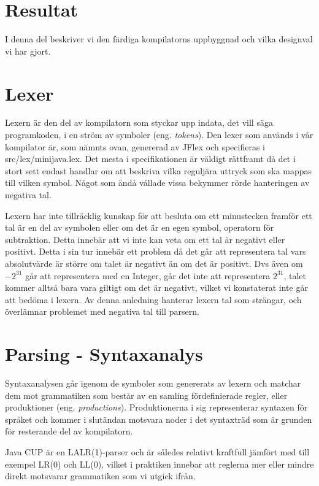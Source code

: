 \documentclass[a4paper,11pt]{article}
\newcommand{\trans}[2][eng.]{(#1 \emph{#2})}
\renewcommand{\*}[0]{\cdot}
\begin{document}
\section*{Resultat}

I denna del beskriver vi den färdiga kompilatorns uppbyggnad och vilka designval vi har gjort.

\section*{Lexer}

Lexern är den del av kompilatorn som styckar upp indata, det vill säga
programkoden, i en ström av symboler \trans{tokens}. Den lexer som används i
vår kompilator är, som nämnts ovan, genererad av JFlex och specifieras i
src/lex/minijava.lex. Det mesta i specifikationen är väldigt rättframt då det i
stort sett endast handlar om att beskriva vilka reguljära uttryck som ska
mappas till vilken symbol. Något som ändå vållade vissa bekymmer rörde
hanteringen av negativa tal.

Lexern har inte tillräcklig kunskap för att besluta om ett minustecken framför
ett tal är en del av symbolen eller om det är en egen symbol, operatorn för
subtraktion. Detta innebär att vi inte kan veta om ett tal är negativt eller
positivt. Detta i sin tur innebär ett problem då det går att representera tal
vars absolutvärde är större om talet är negativt än om det är positivt. Dvs
även om $-2^{31}$ går att representera med en Integer, går det inte att
representera $2^{31}$, talet kommer alltså bara vara giltigt om det är
negativt, vilket vi konstaterat inte går att bedöma i lexern. Av denna
anledning hanterar lexern tal som strängar, och överlämnar problemet med
negativa tal till parsern.

\section*{Parsing - Syntaxanalys}

Syntaxanalysen går igenom de symboler som genererats av lexern och matchar dem
mot grammatiken som består av en samling fördefinierade regler, eller
produktioner \trans{productions}. Produktionerna i sig representerar syntaxen
för språket och kommer i slutändan motsvara noder i det syntaxträd som är
grunden för resterande del av kompilatorn.

Java CUP är en LALR(1)-parser och är således relativt kraftfull jämfört med
till exempel LR(0) och LL(0), vilket i praktiken innebar att reglerna mer eller
mindre direkt motsvarar grammatiken som vi utgick ifrån.
\end{document}
